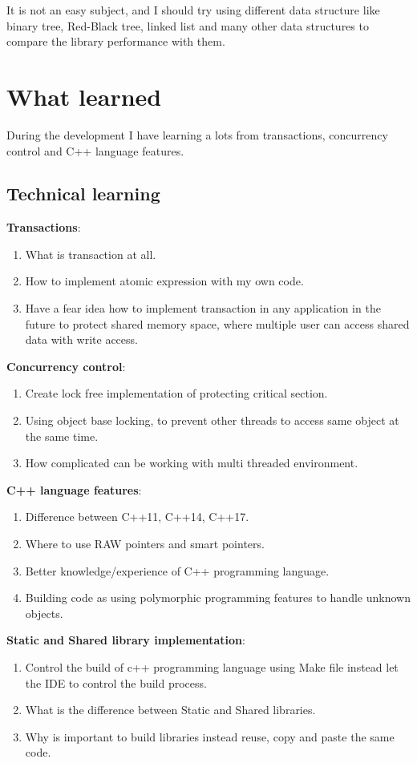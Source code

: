 \documentclass[12pt]{article}
\begin{document}
It is not an easy subject, and I should try using different data structure like binary tree, Red-Black tree, linked list and many other data structures to compare the library performance with them.\\


\newpage
\section{What learned}
During the development I have learning a lots from transactions, concurrency control and C++ language features.
\subsection{Technical learning}
\textbf{Transactions}:
\begin{enumerate}
\item What is transaction at all. 
\item How to implement atomic expression with my own code.
\item Have a fear idea how to implement transaction in any application in the future to protect shared memory space, where multiple user can access shared data with write access.
\end{enumerate}
\textbf{Concurrency control}:
\begin{enumerate}
\item Create lock free implementation of protecting critical section. 
\item Using object base locking, to prevent other threads to access same object at the same time.
\item How complicated can be working with multi threaded environment.
\end{enumerate}
\textbf{C++ language features}:
\begin{enumerate}
\item Difference between C++11, C++14, C++17.
\item Where to use RAW pointers and smart pointers.
\item Better knowledge/experience of C++ programming language.
\item Building code as using polymorphic programming features to handle unknown objects.
\end{enumerate}
\textbf{Static and Shared library implementation}:
\begin{enumerate}
\item Control the build of c++ programming language using Make file instead let the IDE to control the build process.
\item What is the difference between Static and Shared libraries.
\item Why is important to build libraries instead reuse, copy and paste the same code.
\end{enumerate}
\end{document}
